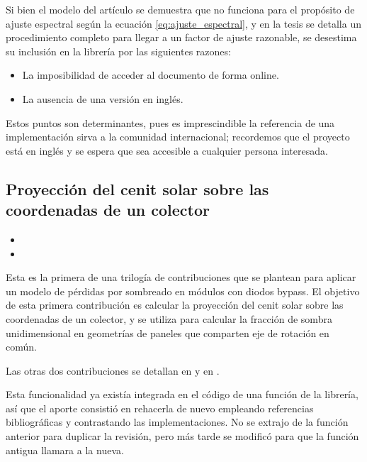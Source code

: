 Si bien el modelo del artículo \cite{Martín_Ruiz_1999} se demuestra que no funciona para el propósito de ajuste espectral según la ecuación \ref{eq:ajuste_espectral}, y en la tesis \cite{Martín_Chivelet_1999} se detalla un procedimiento completo para llegar a un factor de ajuste razonable, se desestima su inclusión en la librería por las siguientes razones:

\begin{itemize}
    \item La imposibilidad de acceder al documento de forma online.
    \item La ausencia de una versión en inglés.
\end{itemize}

Estos puntos son determinantes, pues es imprescindible la referencia de una implementación sirva a la comunidad internacional; recordemos que el proyecto \pvlibpy{} está en inglés y se espera que sea accesible a cualquier persona interesada.

\subsection{Proyección del cenit solar sobre las coordenadas de un colector} \label{sct:desarrollo:contribuciones_cientificas:proyeccion_cenit}

\begin{itemize}
    \item {}
    \item {}
\end{itemize}

Esta es la primera de una trilogía de contribuciones que se plantean para aplicar un \gls{modelo} de pérdidas por sombreado en módulos con diodos bypass. El objetivo de esta primera contribución es calcular la proyección del \gls{cenit} solar sobre las coordenadas de un colector, y se utiliza para calcular la fracción de \gls{sombra} unidimensional en geometrías de paneles que comparten eje de rotación en común.

Las otras dos contribuciones se detallan en  y en .

Esta funcionalidad ya existía integrada en el código de una función de la librería, así que el aporte consistió en rehacerla de nuevo empleando referencias bibliográficas y contrastando las implementaciones. No se extrajo de la función anterior para duplicar la revisión, pero más tarde se modificó para que la función antigua llamara a la nueva.


